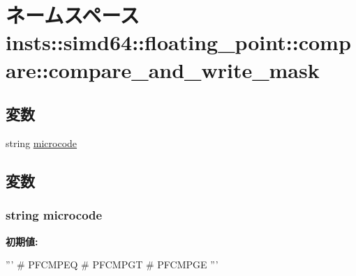 \hypertarget{namespaceinsts_1_1simd64_1_1floating__point_1_1compare_1_1compare__and__write__mask}{
\section{ネームスペース insts::simd64::floating\_\-point::compare::compare\_\-and\_\-write\_\-mask}
\label{namespaceinsts_1_1simd64_1_1floating__point_1_1compare_1_1compare__and__write__mask}
}
\subsection*{変数}
\begin{DoxyCompactItemize}
\item 
string \hyperlink{namespaceinsts_1_1simd64_1_1floating__point_1_1compare_1_1compare__and__write__mask_a770f11a173e99389a8802f0107ed8f52}{microcode}
\end{DoxyCompactItemize}


\subsection{変数}
\hypertarget{namespaceinsts_1_1simd64_1_1floating__point_1_1compare_1_1compare__and__write__mask_a770f11a173e99389a8802f0107ed8f52}{
\subsubsection[{microcode}]{\setlength{\rightskip}{0pt plus 5cm}string {\bf microcode}}}
\label{namespaceinsts_1_1simd64_1_1floating__point_1_1compare_1_1compare__and__write__mask_a770f11a173e99389a8802f0107ed8f52}
{\bfseries 初期値:}
\begin{DoxyCode}
'''
# PFCMPEQ
# PFCMPGT
# PFCMPGE
'''
\end{DoxyCode}

